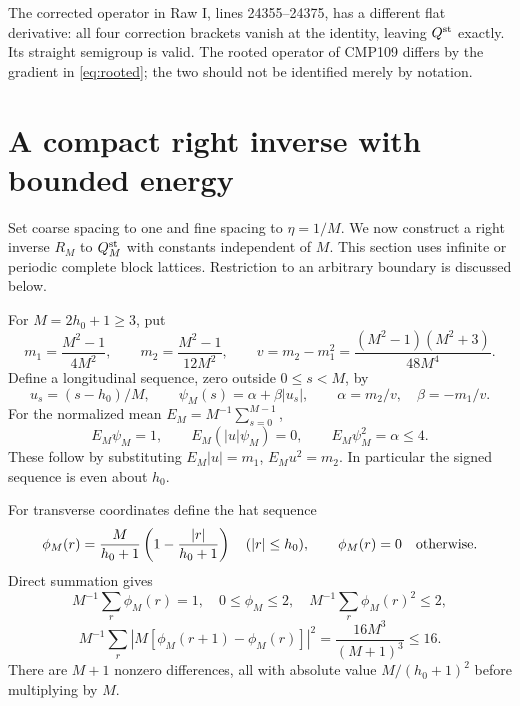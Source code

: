 \documentclass[11pt]{article}
\theoremstyle{remark}
\begin{document}
The corrected operator in Raw I, lines 24355--24375, has a different
flat derivative: all four correction brackets vanish at the identity,
leaving $Q^{\rm st}$ exactly. Its straight semigroup is valid. The
rooted operator of CMP109 differs by the gradient in
\eqref{eq:rooted}; the two should not be identified merely by notation.

\section{A compact right inverse with bounded energy}

Set coarse spacing to one and fine spacing to $\eta=1/M$. We now
construct a right inverse $R_M$ to $Q_M^{\rm st}$ with constants
independent of $M$. This section uses infinite or periodic complete
block lattices. Restriction to an arbitrary boundary is discussed
below.

For $M=2h_0+1\ge3$, put
\[
 m_1=\frac{M^2-1}{4M^2},\qquad
 m_2=\frac{M^2-1}{12M^2},\qquad
 v=m_2-m_1^2
   =\frac{(M^2-1)(M^2+3)}{48M^4}.
\]
Define a longitudinal sequence, zero outside $0\le s<M$, by
\begin{equation}\label{eq:psi}
 u_s=(s-h_0)/M,\qquad
 \psi_M(s)=\alpha+\beta|u_s|,
 \qquad \alpha=m_2/v,\quad\beta=-m_1/v.
\end{equation}
For the normalized mean $E_M=M^{-1}\sum_{s=0}^{M-1}$,
\begin{equation}\label{eq:psi-moments}
 E_M\psi_M=1,\qquad E_M(|u|\psi_M)=0,
 \qquad E_M\psi_M^2=\alpha\le4.
\end{equation}
These follow by substituting $E_M|u|=m_1$, $E_Mu^2=m_2$.
In particular the signed sequence is even about $h_0$.

For transverse coordinates define the hat sequence
\begin{equation}\label{eq:phi}
 \phi_M(r)=\frac{M}{h_0+1}
             \left(1-\frac{|r|}{h_0+1}\right)
 \quad (|r|\le h_0),
 \qquad\phi_M(r)=0\quad\hbox{otherwise}.
\end{equation}
Direct summation gives
\begin{equation}\label{eq:phi-bounds}
 M^{-1}\sum_r\phi_M(r)=1,\quad
 0\le\phi_M\le2,\quad M^{-1}\sum_r\phi_M(r)^2\le2,
\end{equation}
\begin{equation}\label{eq:phi-gradient}
 M^{-1}\sum_r|M[\phi_M(r+1)-\phi_M(r)]|^2
 =\frac{16M^3}{(M+1)^3}\le16.
\end{equation}
There are $M+1$ nonzero differences, all with absolute value
$M/(h_0+1)^2$ before multiplying by $M$.
\end{document}
